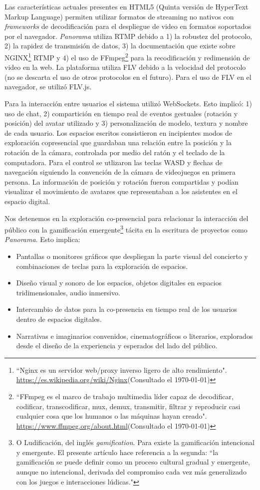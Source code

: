 Las características actuales presentes en HTML5 (Quinta versión de HyperText Markup Language) permiten utilizar formatos de streaming no nativos con \textit{frameworks} de decodificación para el despliegue de video en formatos soportados por el navegador. \textit{Panorama} utiliza RTMP debido a 1) la robustez del protocolo, 2) la rapidez de transmisión de datos, 3) la documentación que existe sobre NGINX\footnote{``Nginx es un servidor web/proxy inverso ligero de alto rendimiento". \url{https://es.wikipedia.org/wiki/Nginx}(Consultado el \today)} RTMP y 4) el uso de FFmpeg\footnote{``FFmpeg es el marco de trabajo multimedia líder capaz de decodificar, codificar, transcodificar, mux, demux, transmitir, filtrar y reproducir casi cualquier cosa que los humanos o las máquinas hayan creado". \url{https://www.ffmpeg.org/about.html}(Consultado el \today)} para la recodificación y redimensión de video en la web. La plataforma utiliza FLV debido a la velocidad del protocolo (no se descarta el uso de otros protocolos en el futuro). Para el uso de FLV en el navegador, se utilizó FLV.js. 

Para la interacción entre usuarios el sistema utilizó WebSockets. Esto implicó: 1) uso de chat, 2) compartición en tiempo real de eventos gestuales (rotación y posición) del avatar utilizado y 3) personalización de modelo, textura y nombre de cada usuario. Los espacios escritos consistieron en incipientes modos de exploración copresencial que guardaban una relación entre la posición y la rotación de la cámara, controlada por medio del ratón y el teclado de la computadora. Para el control se utlizaron las teclas WASD y flechas de navegación siguiendo la convención de la cámara de videojuegos en primera persona. La información de posición y rotación fueron compartidas y podían visualizar el movimiento de avatares que representaban a los asistentes en el espacio digital. 

Nos detenemos en la exploración co-presencial para relacionar la interacción del público con la gamificación emergente\footnote{O Ludificación, del inglés \textit{gamification}. Para \cite{gamificacion} existe la gamificación intencional y emergente. El presente artículo hace referencia a la segunda: ``la gamificación se puede definir como un proceso cultural gradual y emergente, aunque no intencional, derivada del compromiso cada vez más generalizado con los juegos e interacciones lúdicas."} tácita en la escritura de proyectos como \textit{Panorama}. Esto implica:

\begin{itemize}
\item Pantallas o monitores gráficos que despliegan la parte visual del concierto y combinaciones de teclas para la exploración de espacios.
\item Diseño visual y sonoro de los espacios, objetos digitales en espacios tridimensionales, audio inmersivo.
\item Intercambio de datos para la co-presencia en tiempo real de los usuarios dentro de espacios digitales.
\item Narrativas e imaginarios convenidos, cinematográficos o literarios, explorados desde el diseño de la experiencia y esperados del lado del público. 
\end{itemize}

